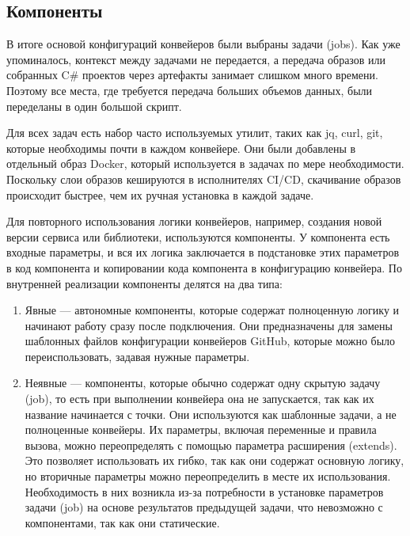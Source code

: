\subsection{Компоненты}
В итоге основой конфигураций конвейеров были выбраны задачи (jobs). Как уже упоминалось, контекст между задачами не передается, а передача образов или собранных C\# проектов через артефакты занимает слишком много времени. Поэтому все места, где требуется передача больших объемов данных, были переделаны в один большой скрипт.

Для всех задач есть набор часто используемых утилит, таких как jq, curl, git, которые необходимы почти в каждом конвейере. Они были добавлены в отдельный образ Docker, который используется в задачах по мере необходимости. Поскольку слои образов кешируются в исполнителях CI/CD, скачивание образов происходит быстрее, чем их ручная установка в каждой задаче.

Для повторного использования логики конвейеров, например, создания новой версии сервиса или библиотеки, используются компоненты. У компонента есть входные параметры, и вся их логика заключается в подстановке этих параметров в код компонента и копировании кода компонента в конфигурацию конвейера. По внутренней реализации компоненты делятся на два типа:
\begin{enumerate}
  \item Явные --- автономные компоненты, которые содержат полноценную логику и начинают работу сразу после подключения. Они предназначены для замены шаблонных файлов конфигурации конвейеров GitHub, которые можно было переиспользовать, задавая нужные параметры.
  \item Неявные --- компоненты, которые обычно содержат одну скрытую задачу (job), то есть при выполнении конвейера она не запускается, так как их название начинается с точки. Они используются как шаблонные задачи, а не полноценные конвейеры. Их параметры, включая переменные и правила вызова, можно переопределять с помощью параметра расширения (extends). Это позволяет использовать их гибко, так как они содержат основную логику, но вторичные параметры можно переопределить в месте их использования. Необходимость в них возникла из-за потребности в установке параметров задачи (job) на основе результатов предыдущей задачи, что невозможно с компонентами, так как они статические.
\end{enumerate}


